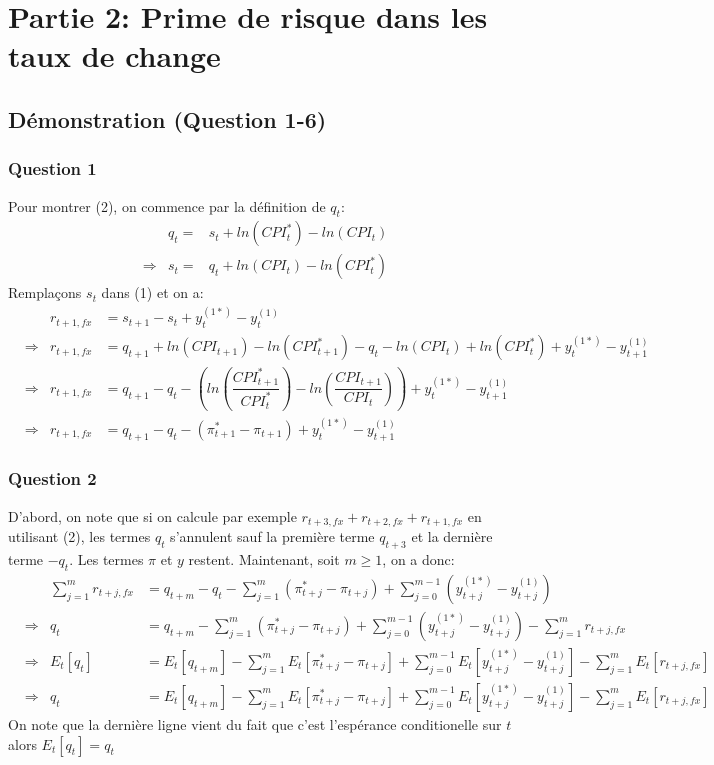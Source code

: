 \documentclass[letterpaper,11pt]{article}
\newcommand{\?}{\stackrel{?}{=}}
\newcommand{\macroA}[1]{y_{#1}^{(1*)}}
\newcommand{\macroB}[1]{y_{#1}^{(1)}}
\newcommand{\macroC}[1]{r_{#1,fx}}
\begin{document}
\section*{Partie 2: Prime de risque dans les taux de change}
\subsection*{Démonstration (Question 1-6)}
\subsubsection*{Question 1}
Pour montrer (2), on commence par la définition de $q_t$:
\begin{equation*}
\begin{aligned}
    &&q_t =& s_t+ln(CPI_t^*)-ln(CPI_t)\\
&\Rightarrow&   s_t =&q_t+ln(CPI_t)-ln(CPI_t^*)
\end{aligned}
\end{equation*}
Remplaçons $s_t$ dans (1) et on a:
\begin{equation*}
\begin{aligned}
    &&r_{t+1,fx} &= s_{t+1}-s_t+y_t^{(1*)}-y_t^{(1)}\\
&\Rightarrow&   \macroC{t+1} &=q_{t+1}+ln(CPI_{t+1})-ln(CPI_{t+1}^*)-q_t-ln(CPI_t)+ln(CPI_t^*) + \macroA{t}-\macroB{t+1}\\
&\Rightarrow&   \macroC{t+1} &= q_{t+1}-q_t -\left( ln\left(\dfrac{CPI^*_{t+1}}{CPI^*_t}\right)-ln\left(\dfrac{CPI_{t+1}}{CPI_t}\right) \right)+ \macroA{t}-\macroB{t+1}\\
&\Rightarrow&   \macroC{t+1} &= q_{t+1}-q_t -(\pi^*_{t+1}-\pi_{t+1})+ \macroA{t}-\macroB{t+1}
\end{aligned}
\end{equation*}
\subsubsection*{Question 2}
D'abord, on note que si on calcule par exemple $\macroC{t+3}+\macroC{t+2}+\macroC{t+1}$ en utilisant (2), les termes $q_t$ s'annulent sauf la première terme $q_{t+3}$ et la dernière terme $-q_t$. Les termes $\pi$ et $y$ restent. Maintenant, soit $m\geq1$, on a donc:
\begin{equation*}
\begin{aligned}
    &&\sum_{j=1}^{m}\macroC{t+j} &= q_{t+m}-q_t-\sum_{j=1}^{m}(\pi^*_{t+j}-\pi_{t+j})+\sum_{j=0}^{m-1}(\macroA{t+j}-\macroB{t+j})\\
&\Rightarrow&   q_t &=q_{t+m}-\sum_{j=1}^{m}(\pi^*_{t+j}-\pi_{t+j})+\sum_{j=0}^{m-1}(\macroA{t+j}-\macroB{t+j})-\sum_{j=1}^{m}\macroC{t+j}\\
&\Rightarrow&   E_t[q_t] &=E_t[q_{t+m}]-\sum_{j=1}^{m}E_t[\pi^*_{t+j}-\pi_{t+j}]+\sum_{j=0}^{m-1}E_t[\macroA{t+j}-\macroB{t+j}]-\sum_{j=1}^{m}E_t[\macroC{t+j}]\\
&\Rightarrow&  q_t &=E_t[q_{t+m}]-\sum_{j=1}^{m}E_t[\pi^*_{t+j}-\pi_{t+j}]+\sum_{j=0}^{m-1}E_t[\macroA{t+j}-\macroB{t+j}]-\sum_{j=1}^{m}E_t[\macroC{t+j}]
\end{aligned}
\end{equation*}
On note que la dernière ligne vient du fait que c'est l'espérance conditionelle sur $t$ alors $E_t[q_t]=q_t$
\end{document}
